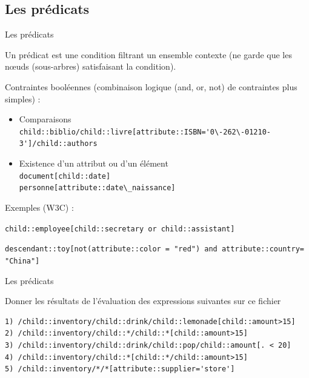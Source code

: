 \subsection{Les prédicats}

\begin{frame}{Les prédicats}

Un prédicat est une condition filtrant un ensemble contexte (ne garde que les n{\oe}uds (sous-arbres) satisfaisant la condition).\\

\medskip


Contraintes booléennes (combinaison logique (and, or, not) de contraintes plus simples) :
\begin{itemize}
\item Comparaisons \\
	\verb?child::biblio/child::livre[attribute::ISBN='0\-262\-01210-3']/child::authors?
\item Existence d'un attribut ou d'un élément \\
	\verb?document[child::date]?\\
	\verb?personne[attribute::date\_naissance]?
\end{itemize}


\bigskip

Exemples (W3C) :\\

\smallskip

\verb?child::employee[child::secretary or child::assistant]?\\

\smallskip

\verb?descendant::toy[not(attribute::color = "red") and attribute::country= "China"]?

\end{frame}


\begin{frame}{Les prédicats}

\vspace{-0.5cm}
     \begin{minipage}{0.7\textwidth}
        
      \end{minipage}

\vspace{-0.5cm}
\begin{exoblock}{Donner les résultats de l'évaluation des expressions suivantes sur ce fichier}
     \begin{footnotesize}
\begin{verbatim}
1) /child::inventory/child::drink/child::lemonade[child::amount>15]
2) /child::inventory/child::*/child::*[child::amount>15]
3) /child::inventory/child::drink/child::pop/child::amount[. < 20]
4) /child::inventory/child::*[child::*/child::amount>15]
5) /child::inventory/*/*[attribute::supplier='store']
\end{verbatim}
     \end{footnotesize}
      \end{exoblock}
\end{frame}

